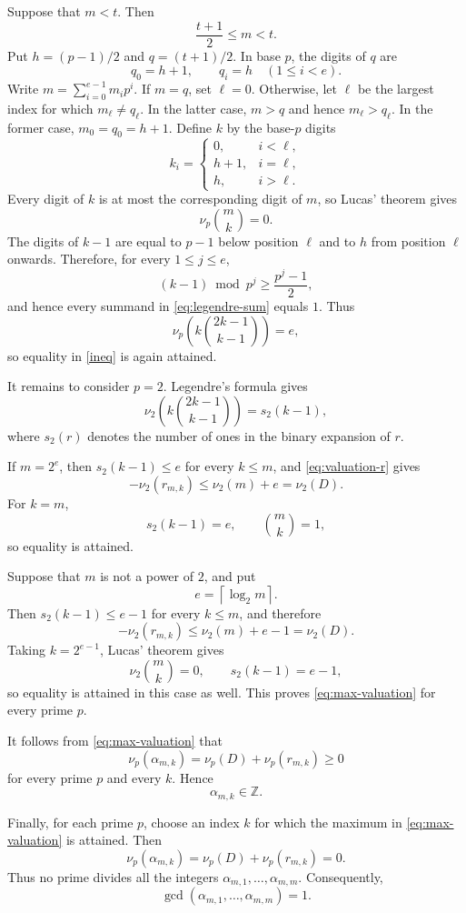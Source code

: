 \documentclass[14pt,dvipsnames]{extarticle}
\makeatletter
\numberwithin{equation}{subsection}
\theoremstyle{plain}
\theoremstyle{definition}
\theoremstyle{definition}
\renewenvironment{proof}[1][\proofname]{
 \par\pushQED{\qed}\normalfont
 \topsep6\p@\@plus6\p@\relax
 \trivlist\item[\hskip\labelsep\bfseries\itshape #1\@addpunct{.}]
}{\popQED\endtrivlist\@endpefalse}
\newcommand{\vp}{\nu_p}
\makeatother
\begin{document}
\begin{proof}
Suppose that \(m<t\). Then
\[
\frac{t+1}{2}\leq m<t.
\]
Put \(h=(p-1)/2\) and \(q=(t+1)/2\). In base \(p\), the digits of
\(q\) are
\[
q_0=h+1,
\qquad
q_i=h\quad (1\leq i<e).
\]
Write \(m=\sum_{i=0}^{e-1}m_ip^i\). If \(m=q\), set \(\ell=0\).
Otherwise, let \(\ell\) be the largest index for which \(m_\ell\neq q_\ell\).
In the latter case, $m>q$ and hence $m_\ell>q_\ell$. In the former case,
$m_0=q_0=h+1$. Define \(k\) by the base-\(p\)
digits
\[
k_i=
\begin{cases}
0,&i<\ell,\\
h+1,&i=\ell,\\
h,&i>\ell.
\end{cases}
\]
Every digit of \(k\) is at most the corresponding digit of \(m\), so
Lucas' theorem gives
\[
\vp\binom{m}{k}=0.
\]
The digits of \(k-1\) are equal to \(p-1\) below position \(\ell\) and
to \(h\) from position \(\ell\) onwards. Therefore, for every
\(1\leq j\leq e\),
\[
(k-1)\bmod p^j\geq\frac{p^j-1}{2},
\]
and hence every summand in \eqref{eq:legendre-sum} equals \(1\).
Thus
\[
\vp\!\left(k\binom{2k-1}{k-1}\right)=e,
\]
so equality in \eqref{ineq} is again attained.

It remains to consider \(p=2\). Legendre's formula gives
\begin{equation}\label{eq:binary-weight}
\nu_2\!\left(k\binom{2k-1}{k-1}\right)=s_2(k-1),
\end{equation}
where \(s_2(r)\) denotes the number of ones in the binary expansion of
\(r\).

If \(m=2^e\), then \(s_2(k-1)\leq e\) for every \(k\leq m\), and
\eqref{eq:valuation-r} gives
\[
-\nu_2(r_{m,k})\leq\nu_2(m)+e=\nu_2(D).
\]
For \(k=m\),
\[
s_2(k-1)=e,
\qquad
\binom{m}{k}=1,
\]
so equality is attained.

Suppose that \(m\) is not a power of \(2\), and put
\[
e=\left\lceil\log_2m\right\rceil.
\]
Then \(s_2(k-1)\leq e-1\) for every \(k\leq m\), and therefore
\[
-\nu_2(r_{m,k})
\leq
\nu_2(m)+e-1
=
\nu_2(D).
\]
Taking \(k=2^{e-1}\), Lucas' theorem gives
\[
\nu_2\binom{m}{k}=0,
\qquad
s_2(k-1)=e-1,
\]
so equality is attained in this case as well. This proves
\eqref{eq:max-valuation} for every prime \(p\).

It follows from \eqref{eq:max-valuation} that
\[
\vp(\alpha_{m,k})
=
\vp(D)+\vp(r_{m,k})
\geq0
\]
for every prime \(p\) and every \(k\). Hence
\[
\alpha_{m,k}\in\mathbb Z.
\]

Finally, for each prime \(p\), choose an index \(k\) for which the maximum
in \eqref{eq:max-valuation} is attained. Then
\[
\vp(\alpha_{m,k})
=
\vp(D)+\vp(r_{m,k})
=
0.
\]
Thus no prime divides all the integers \(\alpha_{m,1},\ldots,\alpha_{m,m}\).
Consequently,
\[
\gcd(\alpha_{m,1},\ldots,\alpha_{m,m})=1.
\]
\end{proof}
\end{document}
